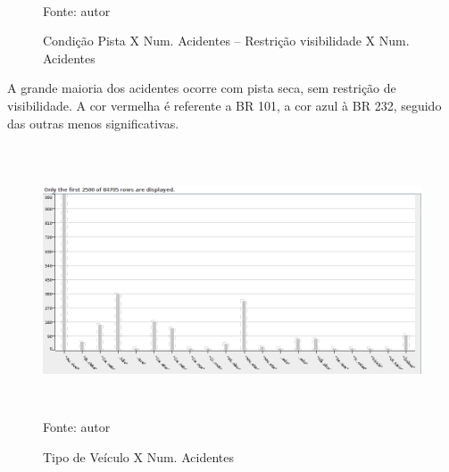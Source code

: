\begin{figure}[ht]
\begin{center}
\caption{Condição Pista X Num. Acidentes -- Restrição visibilidade X Num. Acidentes}
\qquad
\\
\tiny Fonte: autor
\end{center}
\end{figure}

A grande maioria dos acidentes ocorre com pista seca, sem restrição de visibilidade. 
A cor vermelha é referente a BR 101, a cor azul à BR 232, seguido das outras menos significativas.

\pagebreak

\begin{figure}[ht]
\begin{center}
\caption{Tipo de Veículo X Num. Acidentes}
\includegraphics[width=150mm, height=80mm]{Figuras/Preprocess/TipoVeiculoXNumAciden.png}\\
\tiny Fonte: autor
\end{center}
\end{figure}

